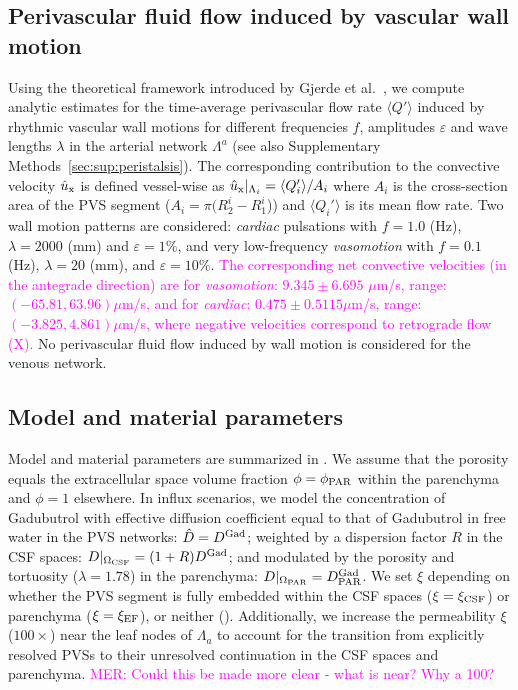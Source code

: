 \documentclass[fleqn,10pt]{wlscirep}
\newcommand{\mer}[1]{\textcolor{magenta}{#1}}
\begin{document}
\subsection*{Perivascular fluid flow induced by vascular wall motion}

Using the theoretical framework introduced by Gjerde et
al.~\cite{gjerde2023directional}, we compute analytic estimates for
the time-average perivascular flow rate $\langle Q' \rangle$ induced
by rhythmic vascular wall motions for different frequencies $f$,
amplitudes $\varepsilon$ and wave lengths $\lambda$ in the arterial
network $\Lambda^a$ (see also Supplementary
Methods~\ref{sec:sup:peristalsis}). The corresponding contribution to
the convective velocity $\hat{u}_{\rm x}$ is defined vessel-wise as
$\hat{u}_{\rm x}|_{\Lambda_i} = \langle Q'_i \rangle/A_i$ where $A_i$
is the cross-section area of the PVS segment ($A_i = \pi (R_2^i -
R_1^i$)) and $\langle Q_i' \rangle$ is its mean flow rate. Two wall
motion patterns are considered: \emph{cardiac} pulsations with $f =
1.0$ (Hz), $\lambda = 2000$ (mm) and $\varepsilon = 1\%$, and very
low-frequency \emph{vasomotion} with $f = 0.1$ (Hz), $\lambda = 20$
(mm), and $\varepsilon = 10\%$. \mer{The corresponding net convective
velocities (in the antegrade direction) are for \emph{vasomotion}:
$9.345 \pm 6.695$ $\mu$m/s, range: $(-65.81, 63.96) \mu$m/s, and for
\emph{cardiac}: $0.475 \pm 0.5115 \mu$m/s, range: $(- 3.825, 4.861)
\mu$m/s, where negative velocities correspond to retrograde flow
(\Cref{fig:pvs}\mer{X}).} No perivascular fluid flow induced by wall
motion is considered for the venous network.


\subsection*{Model and material parameters}

Model and material parameters are summarized in .
We assume that the porosity equals the extracellular space volume
fraction $\phi = \phi_{\rm PAR}$ within the parenchyma and $\phi = 1$
elsewhere. In influx scenarios, we model the concentration of
Gadubutrol with effective diffusion coefficient equal to that of
Gadubutrol in free water in the PVS networks: $\hat{D} = D^{\rm Gad}$;
weighted by a dispersion factor $R$ in the CSF spaces:
$D|_{\Omega_{\rm CSF}} = ( 1 + R) D^{\rm Gad}$; and modulated by the
porosity and tortuosity ($\lambda = 1.78$) in the parenchyma:
$D|_{\Omega_{\rm PAR}} = D^{\rm Gad}_{\rm PAR}$. We set $\xi$
depending on whether the PVS segment is fully embedded within the CSF
spaces ($\xi = \xi_{\rm CSF}$) or parenchyma ($\xi = \xi_{\rm EF}$),
or neither (). Additionally, we increase the
permeability $\xi$ ($100\times$) near the leaf nodes of $\Lambda_a$ to
account for the transition from explicitly resolved PVSs to their
unresolved continuation in the CSF spaces and parenchyma. \mer{MER:
Could this be made more clear - what is near? Why a 100?}
\end{document}
